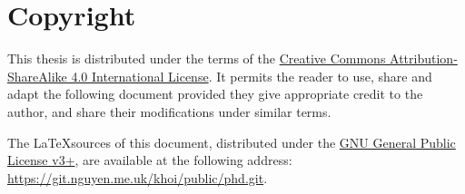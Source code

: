 \chapter*{Copyright}

This thesis is distributed under the terms of the
\href{http://creativecommons.org/licenses/by-sa/4.0/}{Creative Commons Attribution-ShareAlike 4.0 International License}.
It permits the reader to use, share and adapt the following document
provided they give appropriate credit to the author, and share their modifications under similar terms.

The \LaTeX sources of this document,
distributed under the \href{https://www.gnu.org/licenses/gpl.html}{GNU General Public License v3+},
are available at the following address: \url{https://git.nguyen.me.uk/khoi/public/phd.git}.
